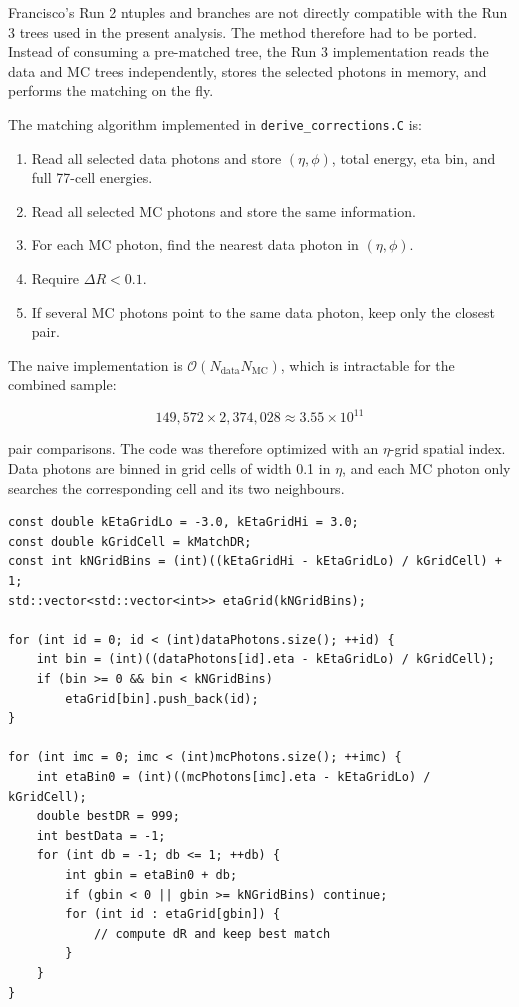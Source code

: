 \documentclass[11pt,a4paper]{article}
\begin{document}
Francisco's Run 2 ntuples and branches are not directly compatible with the Run
3 trees used in the present analysis. The method therefore had to be ported.
Instead of consuming a pre-matched tree, the Run 3 implementation reads the
data and MC trees independently, stores the selected photons in memory, and
performs the matching on the fly.

The matching algorithm implemented in \texttt{derive\_corrections.C} is:

\begin{enumerate}
  \item Read all selected data photons and store $(\eta,\phi)$, total energy,
  eta bin, and full 77-cell energies.
  \item Read all selected MC photons and store the same information.
  \item For each MC photon, find the nearest data photon in $(\eta,\phi)$.
  \item Require $\Delta R < 0.1$.
  \item If several MC photons point to the same data photon, keep only the
  closest pair.
\end{enumerate}

The naive implementation is $\mathcal{O}(N_{\mathrm{data}} N_{\mathrm{MC}})$,
which is intractable for the combined sample:

\begin{equation}
  149{,}572 \times 2{,}374{,}028 \approx 3.55 \times 10^{11}
\end{equation}

pair comparisons. The code was therefore optimized with an $\eta$-grid spatial
index. Data photons are binned in grid cells of width 0.1 in $\eta$, and each
MC photon only searches the corresponding cell and its two neighbours.

\begin{lstlisting}
const double kEtaGridLo = -3.0, kEtaGridHi = 3.0;
const double kGridCell = kMatchDR;
const int kNGridBins = (int)((kEtaGridHi - kEtaGridLo) / kGridCell) + 1;
std::vector<std::vector<int>> etaGrid(kNGridBins);

for (int id = 0; id < (int)dataPhotons.size(); ++id) {
    int bin = (int)((dataPhotons[id].eta - kEtaGridLo) / kGridCell);
    if (bin >= 0 && bin < kNGridBins)
        etaGrid[bin].push_back(id);
}

for (int imc = 0; imc < (int)mcPhotons.size(); ++imc) {
    int etaBin0 = (int)((mcPhotons[imc].eta - kEtaGridLo) / kGridCell);
    double bestDR = 999;
    int bestData = -1;
    for (int db = -1; db <= 1; ++db) {
        int gbin = etaBin0 + db;
        if (gbin < 0 || gbin >= kNGridBins) continue;
        for (int id : etaGrid[gbin]) {
            // compute dR and keep best match
        }
    }
}
\end{lstlisting}
\end{document}
